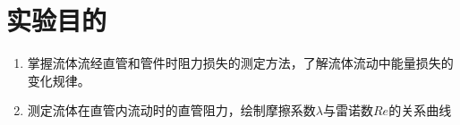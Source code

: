	\chapter*{实验目的}
	
	
	\begin{enumerate}
		\item 掌握流体流经直管和管件时阻力损失的测定方法，了解流体流动中能量损失的变化规律。
            
            \item 测定流体在直管内流动时的直管阻力，绘制摩擦系数$\lambda$与雷诺数$Re$的关系曲线
	\end{enumerate}
	